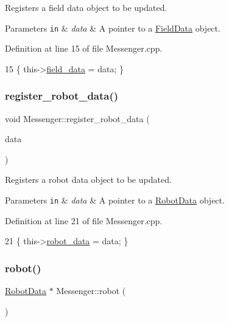 Registers a field data object to be updated. 


\begin{DoxyParams}[1]{Parameters}
\mbox{\tt in}  & {\em data} & A pointer to a \hyperlink{class_field_data}{Field\+Data} object. \\
\hline
\end{DoxyParams}


Definition at line 15 of file Messenger.\+cpp.


\begin{DoxyCode}
15 \{ this->\hyperlink{class_messenger_a8e4a16dc0dcfa44af9030a9ad8f69fa2}{field\_data} = data; \}
\end{DoxyCode}
\mbox{\label{class_messenger_ade23d550433aaa39bd08b4dd092bceeb}} 
\subsubsection{\texorpdfstring{register\+\_\+robot\+\_\+data()}{register\_robot\_data()}}
{\footnotesize\ttfamily void Messenger\+::register\+\_\+robot\+\_\+data (\begin{DoxyParamCaption}\item[{\hyperlink{class_robot_data}{Robot\+Data} $\ast$}]{data }\end{DoxyParamCaption})}



Registers a robot data object to be updated. 


\begin{DoxyParams}[1]{Parameters}
\mbox{\tt in}  & {\em data} & A pointer to a \hyperlink{class_robot_data}{Robot\+Data} object. \\
\hline
\end{DoxyParams}


Definition at line 21 of file Messenger.\+cpp.


\begin{DoxyCode}
21 \{ this->\hyperlink{class_messenger_aaeacb9e9c4aad3b1be628df9ec71c11c}{robot\_data} = data; \}
\end{DoxyCode}
\mbox{\label{class_messenger_aa07992df20b2aee6d2c4defd8d6b110c}} 
\subsubsection{\texorpdfstring{robot()}{robot()}}
{\footnotesize\ttfamily \hyperlink{class_robot_data}{Robot\+Data} $\ast$ Messenger\+::robot (\begin{DoxyParamCaption}\item[{void}]{ }\end{DoxyParamCaption})}



